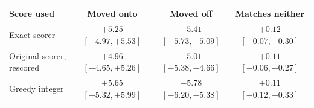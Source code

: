 \begin{tabular}{lccc}
\toprule
Score used & Moved onto & Moved off & Matches neither \\
\midrule
Exact scorer & $+5.25$ {\scriptsize$[+4.97,+5.53]$} & $-5.41$ {\scriptsize$[-5.73,-5.09]$} & $+0.12$ {\scriptsize$[-0.07,+0.30]$} \\
Original scorer, rescored & $+4.96$ {\scriptsize$[+4.65,+5.26]$} & $-5.01$ {\scriptsize$[-5.38,-4.66]$} & $+0.11$ {\scriptsize$[-0.06,+0.27]$} \\
Greedy integer & $+5.65$ {\scriptsize$[+5.32,+5.99]$} & $-5.78$ {\scriptsize$[-6.20,-5.38]$} & $+0.11$ {\scriptsize$[-0.12,+0.33]$} \\
\bottomrule
\end{tabular}
